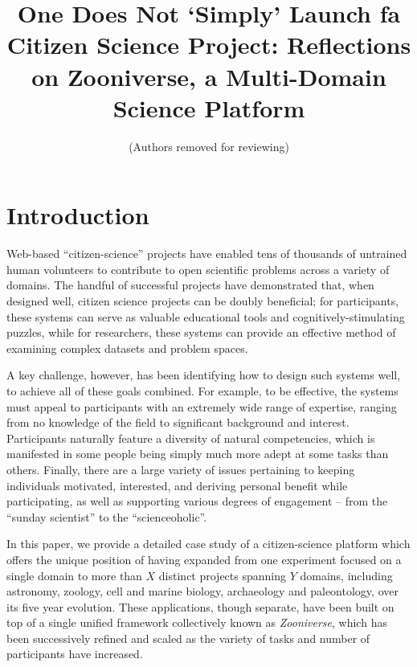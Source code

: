 \documentclass{sigchi}
\begin{document}
\title{One Does Not `Simply' Launch fa Citizen Science Project: Reflections on Zooniverse, a Multi-Domain Science Platform}

 \author{ (Authors removed for reviewing) }
\maketitle

\begin{abstract}

\end{abstract}




\section{Introduction}

Web-based ``citizen-science'' projects have enabled tens of thousands
of untrained human volunteers to contribute to open scientific
problems across a variety of domains.  The handful of successful
projects have demonstrated that, when designed well, citizen science
projects can be doubly beneficial; for participants, these systems can
serve as valuable educational tools and cognitively-stimulating
puzzles, while for researchers, these systems can provide an effective
method of examining complex datasets and problem spaces.

A key challenge, however, has been identifying how to design such
systems well, to achieve all of these goals combined.  For example, to
be effective, the systems must appeal to participants with an
extremely wide range of expertise, ranging from no knowledge of the
field to significant background and interest.  Participants naturally
feature a diversity of natural competencies, which is manifested in
some people being simply much more adept at some tasks than
others. Finally, there are a large variety of issues pertaining to
keeping individuals motivated, interested, and deriving personal
benefit while participating, as well as supporting various degrees of
engagement -- from the ``sunday scientist'' to the ``scienceoholic''.

In this paper, we provide a detailed case study of a citizen-science
platform which offers the unique position of having expanded from one
experiment focused on a single domain to more than $X$ distinct
projects spanning $Y$ domains, including astronomy, zoology, cell and
marine biology, archaeology and paleontology, over its five year
evolution.  These applications, though separate, have been built on
top of a single unified framework collectively known as
\emph{Zooniverse}, which has been successively refined and scaled as
the variety of tasks and number of participants have increased.
\end{document}
